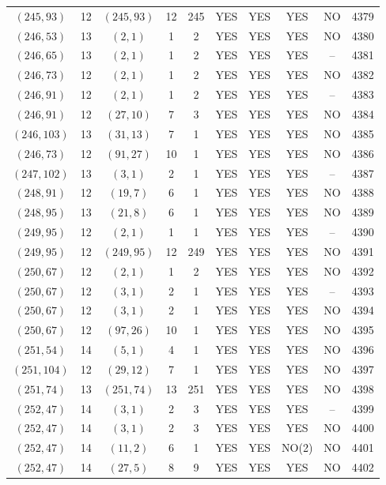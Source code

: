 \begin{longtable}{|c|c|c|c|c|c|c|c|c|c|}
$(245, 93)$ & 12 & $(245, 93)$ & 12 & 245 & YES & YES & YES & NO & 4379\\
$(246, 53)$ & 13 & $(2, 1)$ & 1 & 2 & YES & YES & YES & NO & 4380\\
$(246, 65)$ & 13 & $(2, 1)$ & 1 & 2 & YES & YES & YES & -- & 4381\\
$(246, 73)$ & 12 & $(2, 1)$ & 1 & 2 & YES & YES & YES & NO & 4382\\
$(246, 91)$ & 12 & $(2, 1)$ & 1 & 2 & YES & YES & YES & -- & 4383\\
$(246, 91)$ & 12 & $(27, 10)$ & 7 & 3 & YES & YES & YES & NO & 4384\\
$(246, 103)$ & 13 & $(31, 13)$ & 7 & 1 & YES & YES & YES & NO & 4385\\
$(246, 73)$ & 12 & $(91, 27)$ & 10 & 1 & YES & YES & YES & NO & 4386\\
$(247, 102)$ & 13 & $(3, 1)$ & 2 & 1 & YES & YES & YES & -- & 4387\\
$(248, 91)$ & 12 & $(19, 7)$ & 6 & 1 & YES & YES & YES & NO & 4388\\
$(248, 95)$ & 13 & $(21, 8)$ & 6 & 1 & YES & YES & YES & NO & 4389\\
$(249, 95)$ & 12 & $(2, 1)$ & 1 & 1 & YES & YES & YES & -- & 4390\\
$(249, 95)$ & 12 & $(249, 95)$ & 12 & 249 & YES & YES & YES & NO & 4391\\
$(250, 67)$ & 12 & $(2, 1)$ & 1 & 2 & YES & YES & YES & NO & 4392\\
$(250, 67)$ & 12 & $(3, 1)$ & 2 & 1 & YES & YES & YES & -- & 4393\\
$(250, 67)$ & 12 & $(3, 1)$ & 2 & 1 & YES & YES & YES & NO & 4394\\
$(250, 67)$ & 12 & $(97, 26)$ & 10 & 1 & YES & YES & YES & NO & 4395\\
$(251, 54)$ & 14 & $(5, 1)$ & 4 & 1 & YES & YES & YES & NO & 4396\\
$(251, 104)$ & 12 & $(29, 12)$ & 7 & 1 & YES & YES & YES & NO & 4397\\
$(251, 74)$ & 13 & $(251, 74)$ & 13 & 251 & YES & YES & YES & NO & 4398\\
$(252, 47)$ & 14 & $(3, 1)$ & 2 & 3 & YES & YES & YES & -- & 4399\\
$(252, 47)$ & 14 & $(3, 1)$ & 2 & 3 & YES & YES & YES & NO & 4400\\
$(252, 47)$ & 14 & $(11, 2)$ & 6 & 1 & YES & YES & NO(2) & NO & 4401\\
$(252, 47)$ & 14 & $(27, 5)$ & 8 & 9 & YES & YES & YES & NO & 4402\\

\end{longtable}

